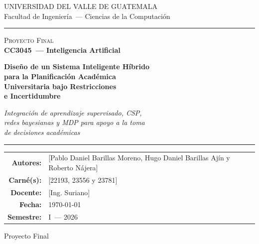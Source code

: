 \documentclass[12pt,twoside]{report}
\theoremstyle{definition}
\begin{document}
\begin{titlepage}
\pagecolor{PrimaryBlue}\color{white}
\vspace*{1.2cm}
\begin{center}
{\fontsize{11}{13}\selectfont\color{white!80}
  UNIVERSIDAD DEL VALLE DE GUATEMALA}\\[0.2cm]
{\fontsize{10}{12}\selectfont\color{white!70}
  Facultad de Ingenier\'ia~--- Ciencias de la Computaci\'on}
\vspace{0.5cm}
\noindent\rule{\linewidth}{0.5pt}
\vspace{0.4cm}

{\fontsize{9}{11}\selectfont\color{white!70}\textsc{Proyecto Final}}\\[0.15cm]
{\fontsize{13}{15}\selectfont\bfseries CC3045~--- Inteligencia Artificial}

\vspace{1.1cm}
{\fontsize{20}{24}\selectfont\bfseries
  Dise\~no de un Sistema Inteligente H\'ibrido\\[0.35cm]
  para la Planificaci\'on Acad\'emica\\[0.35cm]
  Universitaria bajo Restricciones\\[0.35cm]
  e Incertidumbre}

\vspace{0.6cm}
{\fontsize{11}{13}\selectfont\color{white!75}\itshape
  Integraci\'on de aprendizaje supervisado, CSP,\\
  redes bayesianas y MDP para apoyo a la toma\\
  de decisiones acad\'emicas}

\vspace{1.1cm}
\noindent\rule{0.6\linewidth}{0.5pt}
\vspace{0.7cm}

{\fontsize{10}{13}\selectfont
\begin{tabular}{rl}
\textbf{Autores:}  & [Pablo Daniel Barillas Moreno, Hugo Daniel Barillas Ajín y Roberto Nájera]\\[4pt]
\textbf{Carn\'e(s):} & [22193, 23556 y 23781]\\[4pt]
\textbf{Docente:}  & [Ing. Suriano]\\[4pt]
\textbf{Fecha:}    & \today\\[4pt]
\textbf{Semestre:} & I~--- 2026\\
\end{tabular}}
\vspace{1.1cm}

{\fontsize{9}{11}\selectfont\color{white!70}Proyecto Final~}
\end{center}
\end{titlepage}
\nopagecolor
\end{document}
